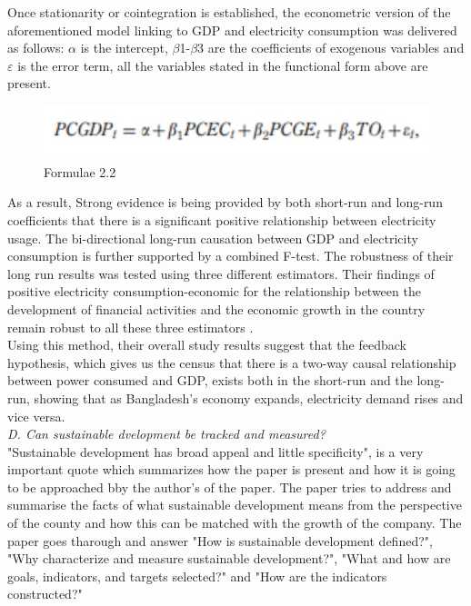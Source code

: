 \documentclass[conference]{IEEEtran}
\begin{document}
Once stationarity or cointegration is established, the econometric version of the aforementioned model linking to GDP and electricity
consumption was delivered as follows: $\alpha$  is the intercept, $\beta$1-$\beta$3 are the coefficients of exogenous variables
and $\varepsilon$  is the error term, all the variables stated in the functional form above are present. \\

\begin{figure}[htbp]
    \centerline{\includegraphics[scale=0.6]{electricity3.jpg}}
    \caption{Formulae 2.2}
\end{figure}
As a result, Strong evidence is being provided by both short-run and long-run coefficients that there is a significant positive relationship between electricity usage.
The bi-directional long-run causation between GDP and electricity consumption is further supported by a combined F-test. The robustness of their long run results was tested using three different estimators.
Their findings of positive electricity consumption-economic for the relationship between the development of financial activities and the economic growth in the country remain robust to all these three estimators .\\
Using this method, their overall study results suggest that the feedback hypothesis, which gives us the census that there is a two-way causal relationship between power consumed and GDP, exists both in the short-run and the long-run, showing that as Bangladesh's economy expands, electricity demand rises and vice versa.
\bigskip
\bigskip
\\
\emph{ D. Can sustainable dvelopment be tracked and measured?}
\\"Sustainable development has broad appeal and little specificity", is a very important quote which summarizes how the paper is present and how it is going to be approached bby the author's of the paper.
The paper tries to address and summarise the facts of what sustainable development means from the perspective of the county and how this can be matched with the growth of the company.
The paper goes tharough and answer "How is sustainable development defined?", "Why characterize and measure sustainable development?", "What and how are goals, indicators, and targets selected?" and  "How are the indicators constructed?"
\end{document}
